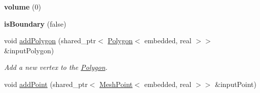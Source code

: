 \begin{DoxyCompactItemize}
\item 
\hypertarget{class_polyhedron_adaff1d63d7ed627999302120b6c98914}{{\bfseries volume} (0)}\label{class_polyhedron_adaff1d63d7ed627999302120b6c98914}

\item 
\hypertarget{class_polyhedron_a03522cce68b4d9cd30eee4c43dfc2f72}{{\bfseries is\-Boundary} (false)}\label{class_polyhedron_a03522cce68b4d9cd30eee4c43dfc2f72}

\item 
\hypertarget{class_polyhedron_a02b8869089bf78342875a197b6995901}{void \hyperlink{class_polyhedron_a02b8869089bf78342875a197b6995901}{add\-Polygon} (shared\-\_\-ptr$<$ \hyperlink{class_polygon}{\-Polygon}$<$ embedded, real $>$$>$ \&input\-Polygon)}\label{class_polyhedron_a02b8869089bf78342875a197b6995901}

\begin{DoxyCompactList}\small\item\em \-Add a new vertex to the \hyperlink{class_polygon}{\-Polygon}. \end{DoxyCompactList}\item 
\hypertarget{class_polyhedron_ad0b79656e93dcd92149f0f3ad53d54e4}{void \hyperlink{class_polyhedron_ad0b79656e93dcd92149f0f3ad53d54e4}{add\-Point} (shared\-\_\-ptr$<$ \hyperlink{class_mesh_point}{\-Mesh\-Point}$<$ embedded, real $>$$>$ \&input\-Point)}\label{class_polyhedron_ad0b79656e93dcd92149f0f3ad53d54e4}


\end{DoxyCompactItemize}
